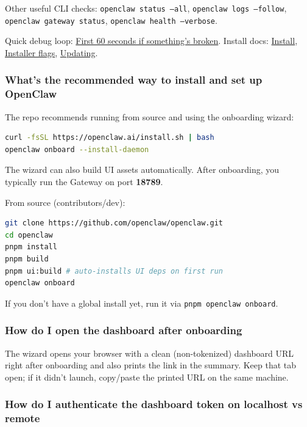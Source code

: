Other useful CLI checks: \texttt{openclaw status --all}, \texttt{openclaw logs --follow},
\texttt{openclaw gateway status}, \texttt{openclaw health --verbose}.

Quick debug loop: \href{\#first-60-seconds-if-somethings-broken}{First 60 seconds if something's broken}.
Install docs: \href{/install}{Install}, \href{/install/installer}{Installer flags}, \href{/install/updating}{Updating}.

\subsubsection{What's the recommended way to install and set up OpenClaw}


The repo recommends running from source and using the onboarding wizard:

\begin{lstlisting}[language=bash]
curl -fsSL https://openclaw.ai/install.sh | bash
openclaw onboard --install-daemon
\end{lstlisting}


The wizard can also build UI assets automatically. After onboarding, you typically run the Gateway on port \textbf{18789}.

From source (contributors/dev):

\begin{lstlisting}[language=bash]
git clone https://github.com/openclaw/openclaw.git
cd openclaw
pnpm install
pnpm build
pnpm ui:build # auto-installs UI deps on first run
openclaw onboard
\end{lstlisting}


If you don't have a global install yet, run it via \texttt{pnpm openclaw onboard}.

\subsubsection{How do I open the dashboard after onboarding}


The wizard opens your browser with a clean (non-tokenized) dashboard URL right after onboarding and also prints the link in the summary. Keep that tab open; if it didn't launch, copy/paste the printed URL on the same machine.

\subsubsection{How do I authenticate the dashboard token on localhost vs remote}


